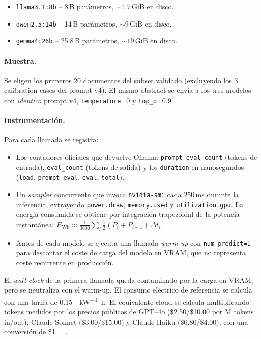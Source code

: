 \begin{itemize}
  \item \texttt{llama3.1:8b} -- 8\,B parámetros, $\sim 4.7$\,GiB en disco.
  \item \texttt{qwen2.5:14b} -- 14\,B parámetros, $\sim 9$\,GiB en disco.
  \item \texttt{gemma4:26b} -- 25.8\,B parámetros, $\sim 19$\,GiB en disco.
\end{itemize}

\paragraph{Muestra.} Se eligen los primeros 20 documentos del subset
validado (excluyendo los 3 calibration cases del prompt v4). El mismo
abstract se envía a los tres modelos con \emph{idéntico} prompt v4,
\texttt{temperature}=0 y \texttt{top\_p}=0.9.

\paragraph{Instrumentación.} Para cada llamada se registra:

\begin{itemize}
  \item Los contadores oficiales que devuelve Ollama:
        \texttt{prompt\_eval\_count} (tokens de entrada),
        \texttt{eval\_count} (tokens de salida) y los \texttt{duration}
        en nanosegundos (\texttt{load}, \texttt{prompt\_eval},
        \texttt{eval}, \texttt{total}).
  \item Un \emph{sampler} concurrente que invoca \texttt{nvidia-smi} cada
        $250$\,ms durante la inferencia, extrayendo
        \texttt{power.draw}, \texttt{memory.used} y \texttt{utilization.gpu}.
        La energía consumida se obtiene por integración trapezoidal
        de la potencia instantánea:
        $E_{\text{Wh}} \approx \tfrac{1}{3600}\sum_i \tfrac{1}{2}(P_i+P_{i-1})\,\Delta t_i$.
  \item Antes de cada modelo se ejecuta una llamada \emph{warm-up} con
        \texttt{num\_predict=1} para descontar el coste de carga del
        modelo en VRAM, que no representa coste recurrente en producción.
\end{itemize}

El \emph{wall-clock} de la primera llamada queda contaminado por la carga
en VRAM, pero se neutraliza con el warm-up. El consumo eléctrico de
referencia se calcula con una tarifa de \SI{0.15}{\eur\per\kilo\watt\hour}.
El equivalente cloud se calcula multiplicando tokens medidos por los
precios públicos de GPT--4o (\$2.50/\$10.00 por M tokens
in/out), Claude Sonnet (\$3.00/\$15.00) y Claude Haiku
(\$0.80/\$4.00), con una conversión de \$1 = .

